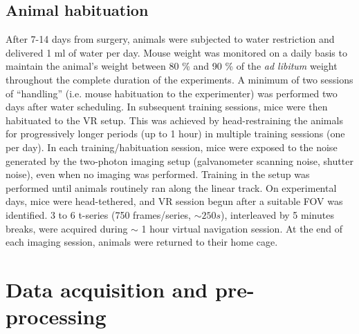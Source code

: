\subsection{Animal habituation}
After 7-14 days from surgery, animals were subjected to water restriction and delivered 1 ml of water per day.
Mouse weight was monitored on a daily basis to  maintain the animal's weight between 80 \% and 90 \% of the \textit{ad libitum} weight throughout the complete duration of the experiments. 
A minimum of two sessions of \enquote{handling} (i.e. mouse habituation to the experimenter) was performed two days after water scheduling. 
In subsequent training sessions, mice were then habituated to the VR setup. 
This was achieved by head-restraining the animals for progressively longer periods (up to 1 hour) in multiple training sessions (one per day). 
In each training/habituation session, mice were exposed to the noise generated by the two-photon imaging setup (galvanometer scanning noise, shutter noise), even when no imaging was performed.
Training in the setup was performed until animals routinely ran along the linear track. 
On experimental days, mice were head-tethered, and VR session begun after a suitable FOV was identified. 
3 to 6 t-series (750 frames/series, $\sim 250 s$), interleaved by 5 minutes breaks, were acquired during $\sim$ 1 hour virtual navigation session. 
At the end of each imaging session, animals were returned to their home cage.
\section{Data acquisition and pre-processing}
\label{chap3:sec:2:preproc}

